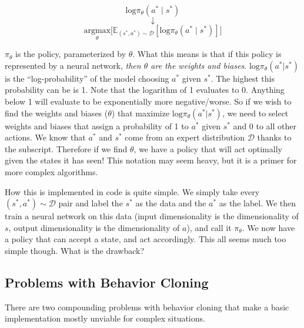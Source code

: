    $$\mathrm{log}\pi_\theta(a^\ast\mid s^\ast)$$
   $$\downarrow$$
   $$\underset{\theta}{\textrm{argmax}}\biggl[\mathbb{E}_{(s^\ast,a^\ast) \sim \mathcal{D}}[\mathrm{log}\pi_\theta(a^\ast \mid s^\ast)]\biggr]$$

   $\pi_\theta$ is the policy, parameterized by $\theta$. What this means is that if this policy is represented by a neural network, \textit{then $\theta$ are the weights and biases}. $\mathrm{log}\pi_\theta(a^\ast|s^\ast)$ is the ``log-probability'' of the model choosing $a^\ast$ given $s^\ast$. The highest this probability can be is 1. Note that the logarithm of 1 evaluates to 0. Anything below 1 will evaluate to be exponentially more negative/worse. So if we wish to find the weights and biases ($\theta$) that maximize $\mathrm{log}\pi_\theta(a^\ast|s^\ast)$, we need to select weights and biases that assign a probability of 1 to $a^\ast$ given $s^\ast$ and 0 to all other actions. We know that $a^\ast$ and $s^\ast$ come from an expert distribution $\mathcal{D}$ thanks to the subscript. Therefore if we find $\theta$, we have a policy that will act optimally given the states it has seen! This notation may seem heavy, but it is a primer for more complex algorithms. 

   How this is implemented in code is quite simple. We simply take every $(s^\ast,a^\ast) \sim \mathcal{D}$ pair and label the $s^\ast$ as the data and the $a^\ast$ as the label. We then train a neural network on this data (input dimensionality is the dimensionality of $s$, output dimensionality is the dimensionality of $a$), and call it $\pi_\theta$. We now have a policy that can accept a state, and act accordingly. This all seems much too simple though. What is the drawback?

\subsection{Problems with Behavior Cloning}
    \large There are two compounding problems with behavior cloning that make a basic implementation mostly unviable for complex situations. 
    
